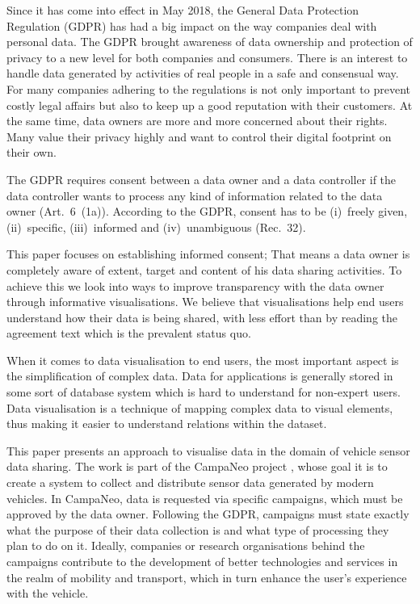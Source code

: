 \documentclass[../paper.tex]{subfiles}
\begin{document}
  Since it has come into effect in May 2018, the General Data Protection
  Regulation (GDPR) \cite{GDPR} has had a big impact on the way companies deal with
  personal data. The GDPR brought awareness of data ownership and protection
  of privacy to a new level for both companies and consumers. There is an
  interest to handle data generated by activities of real people in a safe and
  consensual way. For many companies adhering to the regulations is not only
  important to prevent costly legal affairs but also to keep up a good
  reputation with their customers. At the same time, data owners are more and
  more concerned about their rights. Many value their privacy highly and want
  to control their digital footprint on their own.

  The GDPR requires consent between a data owner and a data controller
  if the data controller wants to process any kind of information related to
  the data owner (Art.~6~(1a)). According to the GDPR, consent has to be
  (i)~freely given, (ii)~specific, (iii)~informed and (iv)~unambiguous (Rec.~32).

  This paper focuses on establishing informed consent; That means a data owner
  is completely aware of extent, target and content of his data sharing
  activities. To achieve this we look into ways to improve transparency with
  the data owner through informative visualisations. We believe that
  visualisations help end users understand how their data is being shared,
  with less effort than by reading the agreement text which is the prevalent
  status quo.

  When it comes to data visualisation to end users, the most important aspect
  is the simplification of complex data. %
  Data for applications is generally stored in some sort of database system
  which is hard to understand for non-expert users. Data visualisation is a
  technique of mapping complex data to visual elements, thus making it easier
  to understand relations within the dataset.

  This paper presents an approach to visualise data in the domain of vehicle
  sensor data sharing. The work is part of the CampaNeo project \cite{campaneo}, whose goal
  it is to create a system to collect and distribute sensor data generated by
  modern vehicles. In CampaNeo, data is requested via specific campaigns, which must be
  approved by the data owner. Following the GDPR, campaigns must state exactly
  what the purpose of their data collection is and what type of processing they
  plan to do on it. Ideally, companies or research organisations behind the
  campaigns contribute to the development of better technologies and services
  in the realm of mobility and transport, which in turn enhance the user’s
  experience with the vehicle.
\end{document}
